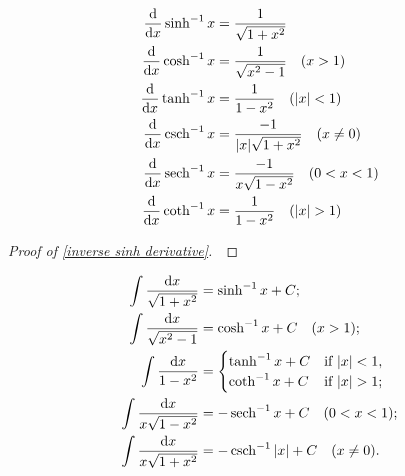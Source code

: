 \begin{theorem}
\begin{align}
\frac{\dee}{\dee x}\sinh^{-1} x & = \frac{1}{\sqrt{1+x^2}}\label{inverse sinh derivative}\\
\frac{\dee}{\dee x}\cosh^{-1} x & = \frac{1}{\sqrt{x^2-1}}\quad (x>1)\\
\frac{\dee}{\dee x}\tanh^{-1} x & = \frac{1}{1-x^2}\quad (|x|<1)\\
\frac{\dee}{\dee x}\csch^{-1} x &=\frac{-1}{|x|\sqrt{1+x^2}}\quad (x\ne 0) \label{inverse csch derivative} \\
\frac{\dee}{\dee x}\sech^{-1} x & = \frac{-1}{x\sqrt{1-x^2}}\quad (0<x<1)\\
\frac{\dee}{\dee x}\coth^{-1} x & = \frac{1}{1-x^2}\quad (|x|>1)
\end{align}
\end{theorem}
\ifdefined\SOLUTION
{}
\else
\begin{proof}[Proof of \eqref{inverse sinh derivative}]\,

\vspace{2.75in}
\end{proof}
\fi

\newpage

\begin{theorem}
\begin{align}
\int\frac{\dee x}{\sqrt{1+x^2}} &= \sinh^{-1} x + C;\\
\int\frac{\dee x}{\sqrt{x^2-1}} & = \cosh^{-1} x + C\quad (x>1);\\
\int\frac{\dee x}{1-x^2} 
&=\begin{cases}
\tanh^{-1} x + C& \text{if } |x|<1,\\
\coth^{-1} x + C& \text{if } |x|>1;
\end{cases}\\
\int\frac{\dee x}{x\sqrt{1-x^2}} &= -\sech^{-1} x + C\quad (0<x<1);\\
\int\frac{\dee x}{x\sqrt{1+x^2}} &=-\csch^{-1} |x| + C\quad (x\ne 0).
\end{align}
\end{theorem}


